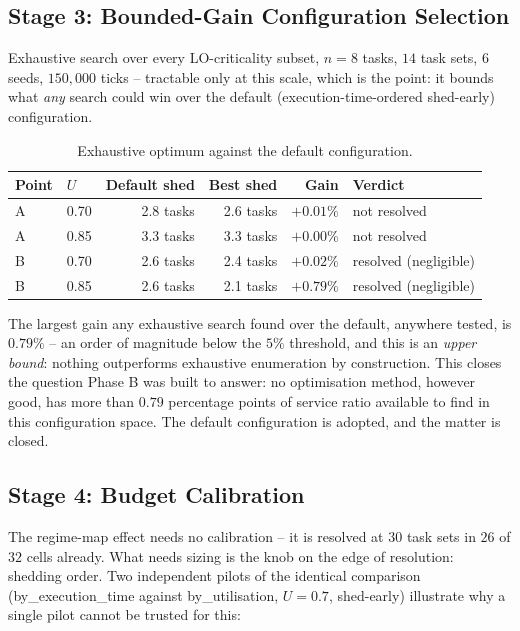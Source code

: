 \documentclass{article}
\begin{document}
\subsection{Stage 3: Bounded-Gain Configuration Selection}
\label{sec:bounded-gain-results}

Exhaustive search over every LO-criticality subset, $n=8$ tasks, $14$ task
sets, $6$ seeds, $150{,}000$ ticks -- tractable only at this scale, which is
the point: it bounds what \emph{any} search could win over the default
(execution-time-ordered shed-early) configuration.

\begin{table}[h]
\centering
\caption{Exhaustive optimum against the default configuration.}
\label{tab:bounded-gain}
\begin{tabular}{llrrrl}
\toprule
Point & $U$ & Default shed & Best shed & Gain & Verdict \\
\midrule
A & 0.70 & 2.8 tasks & 2.6 tasks & $+0.01\%$ & not resolved \\
A & 0.85 & 3.3 tasks & 3.3 tasks & $+0.00\%$ & not resolved \\
B & 0.70 & 2.6 tasks & 2.4 tasks & $+0.02\%$ & resolved (negligible) \\
B & 0.85 & 2.6 tasks & 2.1 tasks & $+0.79\%$ & resolved (negligible) \\
\bottomrule
\end{tabular}
\end{table}

\noindent The largest gain any exhaustive search found over the default,
anywhere tested, is $0.79\%$ -- an order of magnitude below the $5\%$
threshold, and this is an \emph{upper bound}: nothing outperforms exhaustive
enumeration by construction. This closes the question Phase B was built to
answer: no optimisation method, however good, has more than $0.79$ percentage
points of service ratio available to find in this configuration space. The
default configuration is adopted, and the matter is closed.

\subsection{Stage 4: Budget Calibration}
\label{sec:budget-calibration-results}

The regime-map effect needs no calibration -- it is resolved at $30$ task sets
in $26$ of $32$ cells already. What needs sizing is the knob on the edge of
resolution: shedding order. Two independent pilots of the identical comparison
(by\_execution\_time against by\_utilisation, $U=0.7$, shed-early) illustrate
why a single pilot cannot be trusted for this:
\end{document}

